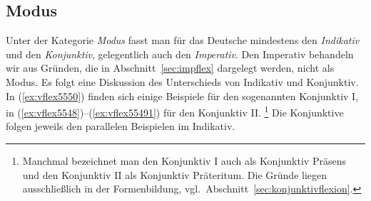 \subsection{Modus}

\label{sec:modus}

Unter der Kategorie \textit{Modus} fasst man für das Deutsche mindestens den \textit{Indikativ} und den \textit{Konjunktiv}, gelegentlich auch den \textit{Imperativ}.
Den Imperativ behandeln wir aus Gründen, die in Abschnitt~\ref{sec:impflex} dargelegt werden, nicht als Modus.
Es folgt eine Diskussion des Unterschieds von Indikativ und Konjunktiv.
In (\ref{ex:vflex5550}) finden sich einige Beispiele für den sogenannten Konjunktiv I, in (\ref{ex:vflex5548})--(\ref{ex:vflex55491}) für den Konjunktiv II.%
\footnote{Manchmal bezeichnet man den Konjunktiv I auch als Konjunktiv Präsens und den Konjunktiv II als Konjunktiv Präteritum.
Die Gründe liegen ausschließlich in der Formenbildung, vgl.\ Abschnitt~\ref{sec:konjunktivflexion}.}
Die Konjunktive folgen jeweils den parallelen Beispielen im Indikativ.

\begin{exe}
  \ex \label{ex:vflex5550}
  \begin{xlist}
  \end{xlist}
  \ex \label{ex:vflex5548}
  \begin{xlist}
  \end{xlist}
  \ex \label{ex:vflex5549}
  \begin{xlist}
  \end{xlist}
  \ex \label{ex:vflex55491}
  \begin{xlist}
  \end{xlist}
\end{exe}

